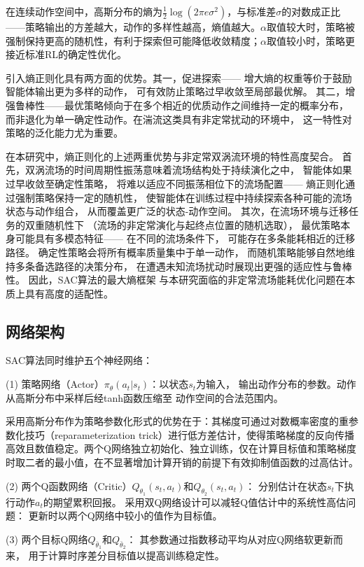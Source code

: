 在连续动作空间中，高斯分布的熵为$\frac{1}{2}\log(2\pi e \sigma^2)$，与标准差$\sigma$的对数成正比——策略输出的方差越大，动作的多样性越高，熵值越大。$\alpha$取值较大时，策略被强制保持更高的随机性，有利于探索但可能降低收敛精度；$\alpha$取值较小时，策略更接近标准RL的确定性优化。

引入熵正则化具有两方面的优势。其一，促进探索——
增大熵的权重等价于鼓励智能体输出更为多样的动作，
可有效防止策略过早收敛至局部最优解。
其二，增强鲁棒性——最优策略倾向于在多个相近的优质动作之间维持一定的概率分布，
而非退化为单一确定性动作。在湍流这类具有非定常扰动的环境中，
这一特性对策略的泛化能力尤为重要。

在本研究中，熵正则化的上述两重优势与非定常双涡流环境的特性高度契合。
首先，双涡流场的时间周期性振荡意味着流场结构处于持续演化之中，
智能体如果过早收敛至确定性策略，
将难以适应不同振荡相位下的流场配置——
熵正则化通过强制策略保持一定的随机性，
使智能体在训练过程中持续探索各种可能的流场状态与动作组合，
从而覆盖更广泛的状态-动作空间。
其次，在流场环境与迁移任务的双重随机性下
（流场的非定常演化与起终点位置的随机选取），
最优策略本身可能具有多模态特征——
在不同的流场条件下，
可能存在多条能耗相近的迁移路径。
确定性策略会将所有概率质量集中于单一动作，
而随机策略能够自然地维持多条备选路径的决策分布，
在遭遇未知流场扰动时展现出更强的适应性与鲁棒性。
因此，SAC算法的最大熵框架
与本研究面临的非定常流场能耗优化问题在本质上具有高度的适配性。


\subsection{网络架构}

SAC算法同时维护五个神经网络：

(1) 策略网络（Actor）$\pi_\theta(a_t | s_t)$：以状态$s_t$为输入，
输出动作分布的参数。动作从高斯分布中采样后经tanh函数压缩至
动作空间的合法范围内。

采用高斯分布作为策略参数化形式的优势在于：其梯度可通过对数概率密度的重参数化技巧（reparameterization trick）进行低方差估计，使得策略梯度的反向传播高效且数值稳定。两个Q网络独立初始化、独立训练，仅在计算目标值和策略梯度时取二者的最小值，在不显著增加计算开销的前提下有效抑制值函数的过高估计。

(2) 两个Q函数网络（Critic）$Q_{\theta_1}(s_t, a_t)$和$Q_{\theta_2}(s_t, a_t)$：
分别估计在状态$s_t$下执行动作$a_t$的期望累积回报。
采用双Q网络设计可以减轻Q值估计中的系统性高估问题：
更新时以两个Q网络中较小的值作为目标值。

(3) 两个目标Q网络$Q_{\bar{\theta}_1}$和$Q_{\bar{\theta}_2}$：
其参数通过指数移动平均从对应Q网络软更新而来，
用于计算时序差分目标值以提高训练稳定性。

